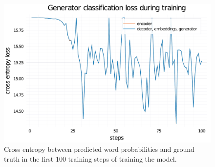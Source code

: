 \begin{figure}
    \centering
    \includegraphics[width=0.7\linewidth]{training-loss-bert-abs-100.pdf}
    \caption{Cross entropy between predicted word probabilities and ground truth in the first 100 training steps of training the \BertSumAbs model.}
    \label{training-loss-bert-abs}
\end{figure}
